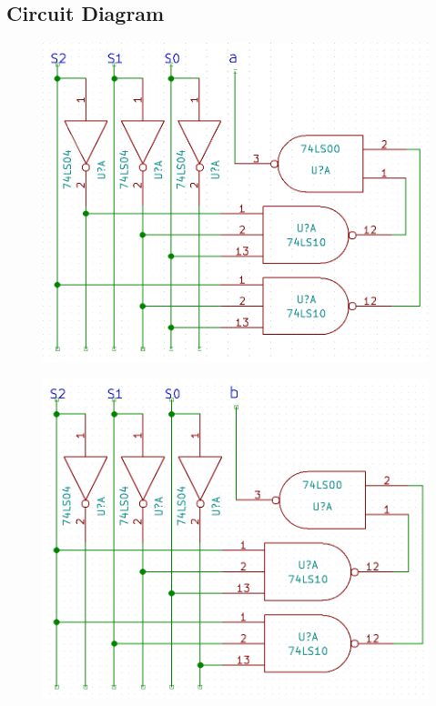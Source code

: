 \documentclass[11pt,a4paper]{article}
\begin{document}
\subsection{Circuit Diagram}
\begin{figure}[H]
    \centering
    \includegraphics[width=6in]{a.png}
\end{figure}
\begin{figure}[H]
    \centering
    \includegraphics[width=6in]{b.png}
\end{figure}
\end{document}
